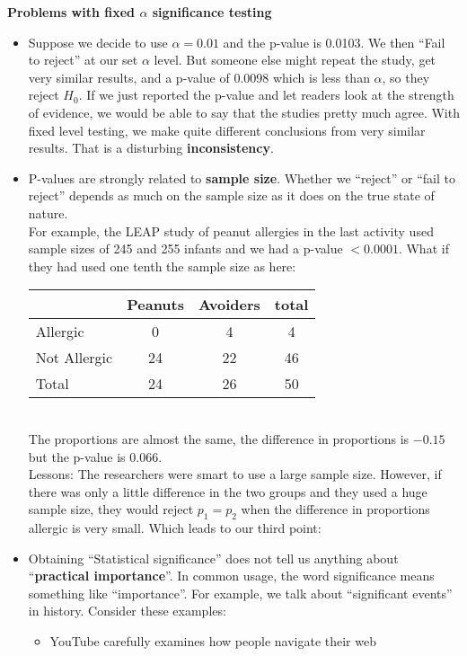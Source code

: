  {\bf Problems with fixed $\alpha$ significance testing}
 \begin{itemize}
 \item Suppose we decide to use $\alpha = 0.01$ and the p-value is
   0.0103.  We then ``Fail to reject'' at our set $\alpha$ level.  But
   someone else might repeat the study, get very similar results, and
   a p-value of 0.0098 which is less than $\alpha$, so they reject
   $H_0$.  If we just reported the p-value and let readers look at the
   strength of evidence, we would be able to say that the studies
   pretty much agree. With fixed level testing, we make quite
   different conclusions from very similar results.  That is a disturbing {\bf
     inconsistency}.
 \item P-values are strongly related to {\bf sample size}. Whether we
   ``reject'' or ``fail to reject'' depends as much on the sample size
   as it does   on the true state of nature. \\
   For example, the LEAP study of peanut allergies in the last
   activity used sample sizes of 245 and 255 infants and we had a
   p-value $< 0.0001$.  What if they had used one tenth the sample
   size as here:\\
\begin{tabular}[c]{|l|c|c|c|} \hline
        &Peanuts & Avoiders & total \\ \hline
Allergic&      0  &   4 &  4\\ \hline
Not Allergic& 24  &  22 &46 \\ \hline
Total &       24  &  26 & 50\\ \hline
\end{tabular}\\
   The proportions are almost the same, the difference in proportions
   is  $-0.15$ but the p-value is 0.066.\\
   Lessons: The researchers were smart to use a large sample
   size. However, if there was only a little difference in the two
   groups and they used a huge sample size, they would reject $p_1 =
   p_2$ when the difference in proportions allergic is very
   small. Which leads to our third point:
 \item Obtaining ``Statistical significance'' does not tell us
   anything about ``{\bf practical importance}''.  In common usage,
   the word significance  means something like ``importance''. For
   example, we talk about ``significant events'' in history. Consider
   these examples: 
   \begin{itemize}
   \item YouTube carefully examines how people navigate their web

\end{itemize}
\end{itemize}
